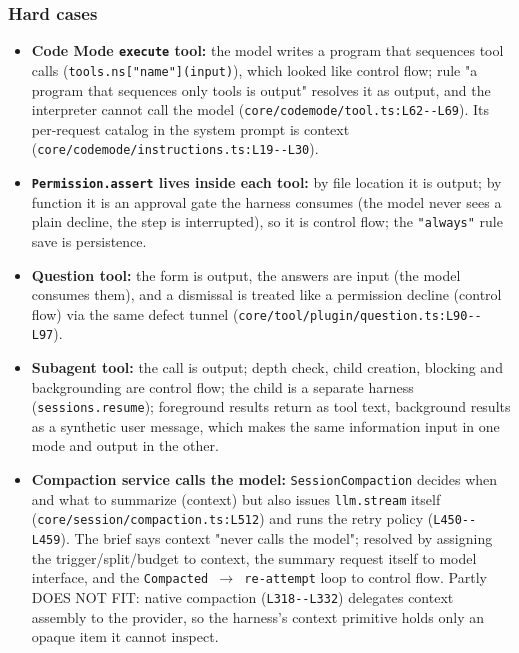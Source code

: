 \subsubsection*{Hard cases}
\begin{itemize}
\item \textbf{Code Mode \texttt{execute} tool:} the model writes a program that sequences tool calls (\texttt{tools.\allowbreak{}ns["name"](\allowbreak{}input)}), which looked like control flow; rule "a program that sequences only tools is output" resolves it as output, and the interpreter cannot call the model (\texttt{core/\allowbreak{}codemode/\allowbreak{}tool.\allowbreak{}ts:\allowbreak{}L62-\allowbreak{}-\allowbreak{}L69}). Its per-request catalog in the system prompt is context (\texttt{core/\allowbreak{}codemode/\allowbreak{}instructions.\allowbreak{}ts:\allowbreak{}L19-\allowbreak{}-\allowbreak{}L30}).
\item \textbf{\texttt{Permission.\allowbreak{}assert} lives inside each tool:} by file location it is output; by function it is an approval gate the harness consumes (the model never sees a plain decline, the step is interrupted), so it is control flow; the \texttt{"always"} rule save is persistence.
\item \textbf{Question tool:} the form is output, the answers are input (the model consumes them), and a dismissal is treated like a permission decline (control flow) via the same defect tunnel (\texttt{core/\allowbreak{}tool/\allowbreak{}plugin/\allowbreak{}question.\allowbreak{}ts:\allowbreak{}L90-\allowbreak{}-\allowbreak{}L97}).
\item \textbf{Subagent tool:} the call is output; depth check, child creation, blocking and backgrounding are control flow; the child is a separate harness (\texttt{sessions.\allowbreak{}resume}); foreground results return as tool text, background results as a synthetic user message, which makes the same information input in one mode and output in the other.
\item \textbf{Compaction service calls the model:} \texttt{SessionCompaction} decides when and what to summarize (context) but also issues \texttt{llm.\allowbreak{}stream} itself (\texttt{core/\allowbreak{}session/\allowbreak{}compaction.\allowbreak{}ts:\allowbreak{}L512}) and runs the retry policy (\texttt{L450-\allowbreak{}-\allowbreak{}L459}). The brief says context "never calls the model"; resolved by assigning the trigger/split/budget to context, the summary request itself to model interface, and the \texttt{Compacted $\rightarrow$ re-\allowbreak{}attempt} loop to control flow. Partly DOES NOT FIT: native compaction (\texttt{L318-\allowbreak{}-\allowbreak{}L332}) delegates context assembly to the provider, so the harness's context primitive holds only an opaque item it cannot inspect.

\end{itemize}
